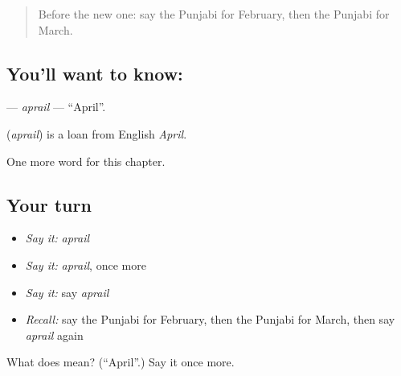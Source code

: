 \label{lesson:PA-C101-aprail}



\begin{quote}
Before the new one: say the Punjabi for February, then the Punjabi for March.
\end{quote}

\subsection*{You'll want to know: }
\textbf{} — \emph{aprail} — \textquotedblleft{}April\textquotedblright{}.

\begin{cousinweb}
\textbf{} (\emph{aprail}) is a loan from English \emph{April}.
\end{cousinweb}

\begin{grammarlens}[title={What you've built}]
One more word for this chapter.
\end{grammarlens}

\subsection*{Your turn}
\begin{itemize}
\raggedright
  \item \emph{Say it:} \emph{aprail}
  \item \emph{Say it:} \emph{aprail}, once more
  \item \emph{Say it:} say \emph{aprail}
  \item \emph{Recall:} say the Punjabi for February, then the Punjabi for March, then say \emph{aprail} again
\end{itemize}

\begin{tcolorbox}[breakable,colback=teal!4,colframe=teal!35!black,title={Before you move on}]
What does  mean? (\textquotedblleft{}April\textquotedblright{}.) Say it once more.
\end{tcolorbox}
